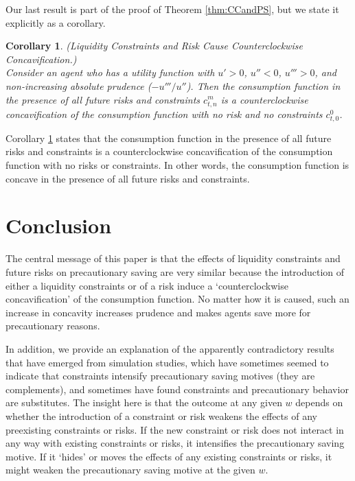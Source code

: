 \documentclass[titlepage]{\econtex}
\newtheorem{corollary}{Corollary}
\begin{document}
  Our last result is part of the proof of Theorem \ref{thm:CCandPS}, but we state it explicitly as a corollary. 

  \begin{corollary}\label{cor:CCRISK} \textit{(Liquidity Constraints and Risk Cause Counterclockwise Concavification.) \\}
    Consider an agent who has a utility function with $u'> 0$, $u''< 0$, $u''' > 0$, and non-increasing absolute prudence ($-u'''/u''$). Then the consumption function in the presence of all future risks and constraints $c_{t,n}^m$ is a counterclockwise concavification of the consumption function with no risk and no constraints $c_{t,0}^0$. 
  \end{corollary}

  \noindent Corollary \ref{cor:CCRISK} states that the consumption function in the presence of all future risks and constraints is a counterclockwise concavification of the consumption function with no risks or constraints. In other words, the consumption function is concave in the presence of all future risks and constraints. 





\section{Conclusion}

The central message of this paper is that the effects of liquidity constraints and future risks on precautionary saving are very similar because the introduction of either a liquidity constraints or of a risk induce a  `counterclockwise concavification' of the consumption function. No matter how it is caused, such an increase in concavity increases prudence and makes agents save more for precautionary reasons. 

In addition, we provide an explanation of the apparently contradictory results that have emerged from simulation studies, which have sometimes seemed to indicate that constraints intensify precautionary saving motives (they are complements), and sometimes have found constraints and precautionary behavior are substitutes. The insight here is that the outcome at any given $w$ depends on whether the introduction of a constraint or risk weakens the effects of any preexisting constraints or risks. If the new constraint or risk does not interact in any way with existing constraints or risks, it intensifies the precautionary saving motive. If it `hides' or moves the effects of any existing constraints or risks, it might weaken the precautionary saving motive at the given $w$.
\end{document}
